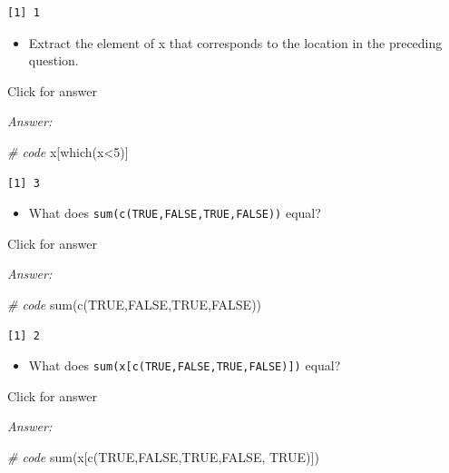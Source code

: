 \documentclass[
]{book}
\newenvironment{Shaded}{\begin{snugshade}}{\end{snugshade}}
\newcommand{\CommentTok}[1]{\textcolor[rgb]{0.56,0.35,0.01}{\textit{#1}}}
\newcommand{\ConstantTok}[1]{\textcolor[rgb]{0.00,0.00,0.00}{#1}}
\newcommand{\DecValTok}[1]{\textcolor[rgb]{0.00,0.00,0.81}{#1}}
\newcommand{\FunctionTok}[1]{\textcolor[rgb]{0.00,0.00,0.00}{#1}}
\newcommand{\NormalTok}[1]{#1}
\newcommand{\SpecialCharTok}[1]{\textcolor[rgb]{0.00,0.00,0.00}{#1}}
\providecommand{\tightlist}{%
  \setlength{\itemsep}{0pt}\setlength{\parskip}{0pt}}
\begin{document}
\begin{verbatim}
[1] 1
\end{verbatim}

\begin{itemize}
\tightlist
\item
  Extract the element of x that corresponds to the location in the preceding question.
\end{itemize}

Click for answer

\emph{Answer:}

\begin{Shaded}
\begin{Highlighting}[]
\CommentTok{\# code}
\NormalTok{x[}\FunctionTok{which}\NormalTok{(x}\SpecialCharTok{\textless{}}\DecValTok{5}\NormalTok{)]}
\end{Highlighting}
\end{Shaded}

\begin{verbatim}
[1] 3
\end{verbatim}

\begin{itemize}
\tightlist
\item
  What does \texttt{sum(c(TRUE,FALSE,TRUE,FALSE))} equal?
\end{itemize}

Click for answer

\emph{Answer:}

\begin{Shaded}
\begin{Highlighting}[]
\CommentTok{\# code}
\FunctionTok{sum}\NormalTok{(}\FunctionTok{c}\NormalTok{(}\ConstantTok{TRUE}\NormalTok{,}\ConstantTok{FALSE}\NormalTok{,}\ConstantTok{TRUE}\NormalTok{,}\ConstantTok{FALSE}\NormalTok{))}
\end{Highlighting}
\end{Shaded}

\begin{verbatim}
[1] 2
\end{verbatim}

\begin{itemize}
\tightlist
\item
  What does \texttt{sum(x{[}c(TRUE,FALSE,TRUE,FALSE){]})} equal?
\end{itemize}

Click for answer

\emph{Answer:}

\begin{Shaded}
\begin{Highlighting}[]
\CommentTok{\# code}
\FunctionTok{sum}\NormalTok{(x[}\FunctionTok{c}\NormalTok{(}\ConstantTok{TRUE}\NormalTok{,}\ConstantTok{FALSE}\NormalTok{,}\ConstantTok{TRUE}\NormalTok{,}\ConstantTok{FALSE}\NormalTok{, }\ConstantTok{TRUE}\NormalTok{)])}
\end{Highlighting}
\end{Shaded}
\end{document}

